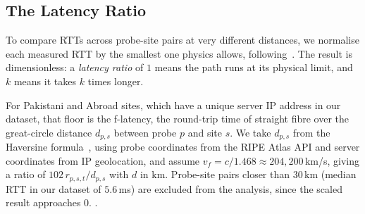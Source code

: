 \documentclass[sigconf,anonymous,10pt]{acmart}
\begin{document}
\subsection{The Latency Ratio}
\label{sec:ratio}
To compare RTTs across probe-site pairs at very different distances, we normalise each measured RTT by the smallest one physics allows, following~\cite{bozkurt:dissecting:2018}. The result is dimensionless: a \emph{latency ratio} of $1$ means the path runs at its physical limit, and $k$ means it takes $k$ times longer.

For Pakistani and Abroad sites, which have a unique server IP address in our dataset, that floor is the f-latency, the round-trip time of straight fibre over the great-circle distance $d_{p,s}$ between probe $p$ and site $s$. We take $d_{p,s}$ from the Haversine formula~\cite{robusto:1957:cosine}, using probe coordinates from the RIPE Atlas API and server coordinates from IP geolocation, and assume $v_f = c/1.468 \approx 204{,}200$\,km/s, giving a ratio of $102\,r_{p,s,t}/d_{p,s}$ with $d$ in km. Probe-site pairs closer than $30$\,km (median RTT in our dataset of $5.6$\,ms) are excluded from the analysis, since the scaled result approaches $0$. .
\end{document}
